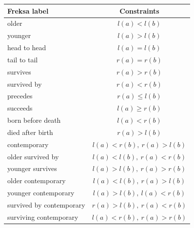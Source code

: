 \documentclass[a4paper,12pt,leqno,twoside]{article}
\begin{document}
\begin{center}
	\begin{tabular}[h!]{|l c|}
		\hline
		\textbf{Freksa label} & \textbf{Constraints}\\
		\hline
		older & $l(a) < l(b)$\\
		younger & $l(a) > l(b)$\\
		head to head & $l(a) = l(b)$\\
		tail to tail & $r(a) = r(b)$\\
		survives & $r(a) > r(b)$\\
		survived by & $r(a) < r(b)$\\
		precedes & $r(a) \le l(b)$\\
		succeeds & $l(a) \ge r(b)$\\
		born before death & $l(a) < r(b)$\\
		died after birth & $r(a) > l(b)$\\
		contemporary & $l(a) < r(b),~ r(a) > l(b)$\\
		older survived by & $l(a) < l(b),~ r(a) < r(b)$\\
		younger survives & $l(a) > l(b),~ r(a) > r(b)$\\
		older contemporary & $l(a) < l(b),~ r(a) > l(b)$\\
		younger contemporary & $l(a) > l(b),~ l(a) < r(b)$\\
		survived by contemporary & $r(a) > l(b),~ r(a) < r(b)$\\
		surviving contemporary & $l(a) < r(b),~ r(a) > r(b)$\\
		\hline
	\end{tabular}
	\label{tab:freksa-constraints}
\end{center}
\end{document}
